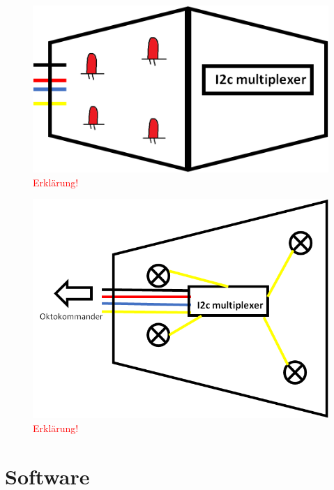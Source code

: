 \begin{figure}[h]
	\centering
	\includegraphics[scale=0.7]{figures/DetektormodulOffen.png}
	\caption{\textcolor{red}{Erklärung!}}
	\label{fig:DetektormodulOffen}
\end{figure}

\begin{figure}[h]
	\centering
	\includegraphics[scale=0.5]{figures/PrinzipskizzeDetektormodul.png}
	\caption{\textcolor{red}{Erklärung!}}
	\label{fig:PrinzipskizzeDetektormodul}
\end{figure}


\section{Software}
\label{sec:Software}

